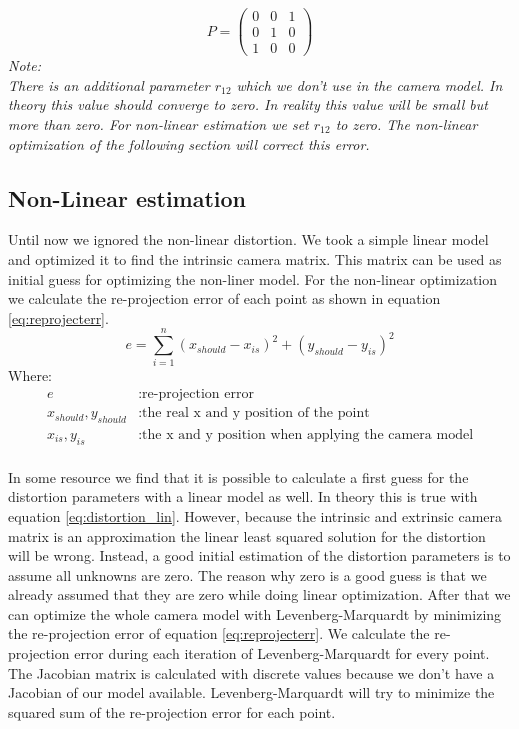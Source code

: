 \documentclass[11pt,a4paper,titlepage,oneside]{report}
\begin{document}
\begin{equation}\label{eq:qr_p}
	P=\begin{pmatrix}
		0 & 0 & 1\\
		0 & 1 & 0\\
		1 & 0 & 0
	\end{pmatrix}
\end{equation}
\em
Note:\\
There is an additional parameter $r_{12}$ which we don't use in the camera model. In theory this value should converge to zero. In reality this value will be small but more than zero. For non-linear estimation we set $r_{12}$ to zero. The non-linear optimization of the following section will correct this error.
\normalfont

\subsection{Non-Linear estimation}\label{sec:nonlinear_est}
Until now we ignored the non-linear distortion. We took a simple linear model and optimized it to find the intrinsic camera matrix. This matrix can be used as initial guess for optimizing the non-liner model. For the non-linear optimization we calculate the re-projection error of each point as shown in equation \ref{eq:reprojecterr}. 
\begin{equation}\label{eq:reprojecterr}
	e=\sum\limits_{i=1}^n(x_{should}-x_{is})^2 +(y_{should}-y_{is})^2
\end{equation}
Where:
\begin{align*}
	e												&: \text{re-projection error}\\
	x_{should},y_{should}		&: \text{the real x and y position of the point}\\
	x_{is},y_{is}						&: \text{the x and y position when applying the camera model}\\
\end{align*}

In some resource we find that it is possible to calculate a first guess for the distortion parameters with a linear model as well. In theory this is true with equation \ref{eq:distortion_lin}.  However, because the intrinsic and extrinsic camera matrix is an approximation the linear least squared solution for the distortion will be wrong. Instead, a good initial estimation of the distortion parameters is to assume all unknowns are zero. The reason why zero is a good guess is that we already assumed that they are zero while doing linear optimization. After that we can optimize the whole camera model with Levenberg-Marquardt by minimizing the re-projection error of equation \ref{eq:reprojecterr}. We calculate the re-projection error during each iteration of Levenberg-Marquardt for every point. The Jacobian matrix is calculated with discrete values because we don't have a Jacobian of our model available. Levenberg-Marquardt will try to minimize the squared sum of the re-projection error for each point.
\end{document}
